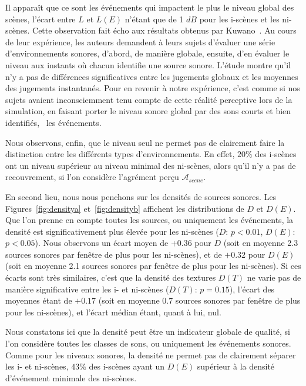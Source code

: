 Il apparaît que ce sont les événements qui impactent le plus le niveau global des scènes, l'écart entre $L$ et $L(E)$ n'étant que de 1 $dB$ pour les i-scènes et les ni-scènes. Cette observation fait écho aux résultats obtenus par Kuwano~\al \citep{kuwano_memory_2003}. Au cours de leur expérience, les auteurs demandent à leurs sujets d'évaluer une série d'environnements sonores, d'abord, de manière globale, ensuite, d'en évaluer le niveau aux instants où chacun identifie une source sonore. L'étude montre qu'il n'y a pas de différences significatives entre les jugements globaux et les moyennes des jugements instantanés. Pour en revenir à notre expérience, c'est comme si nos sujets avaient inconsciemment tenu compte de cette réalité perceptive lors de la simulation, en faisant porter le niveau sonore global par des sons courts et bien identifiés, \ie~les événements.

Nous observons, enfin, que le niveau seul ne permet pas de clairement faire la distinction entre les différents types d'environnements. En effet, $20\%$ des i-scènes ont un niveau supérieur au niveau minimal des ni-scènes, alors qu'il n'y a pas de recouvrement, si l'on considère l'agrément perçu $\mathcal{A}_{scene}$.

En second lieu, nous nous penchons sur les densités de sources sonores. Les Figures~\ref{fig:densitya} et~\ref{fig:densityb} affichent les distributions de $D$ et $D(E)$. Que l'on prenne en compte toutes les sources, ou uniquement les événements, la densité est significativement plus élevée pour les ni-scènes ($D$: $p<0.01$, $D(E)$: $p<0.05$). Nous observons un écart moyen de $+0.36$ pour $D$ (soit en moyenne 2.3 sources sonores par fenêtre de plus pour les ni-scènes), et de $+0.32$ pour $D(E)$ (soit en moyenne 2.1 sources sonores par fenêtre de plus pour les ni-scènes). Si ces écarts sont très similaires, c'est que la densité des textures $D(T)$ ne varie pas de manière significative entre les i- et ni-scènes ($D(T)$: $p=0.15$), l'écart des moyennes étant de $+0.17$ (soit en moyenne 0.7 sources sonores par fenêtre de plus pour les ni-scènes), et l'écart médian étant, quant à lui, nul. 

Nous constatons ici que la densité peut être un indicateur globale de qualité, si l'on considère toutes les classes de sons, ou uniquement les événements sonores. Comme pour les niveaux sonores, la densité ne permet pas de clairement séparer les i- et ni-scènes,  $43\%$ des i-scènes ayant un $D(E)$ supérieur à la densité d'événement minimale des ni-scènes.

